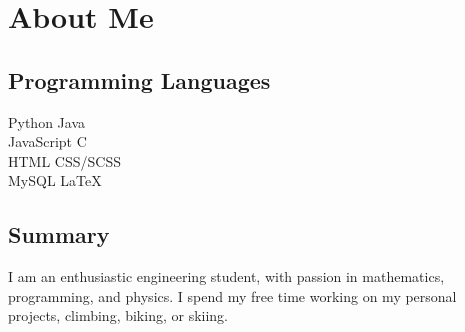 \documentclass[]{deedy-resume-openfont}
\begin{document}
\section{About Me}
\begin{minipage}[t]{.35\textwidth}
	\subsection{Programming Languages}
	Python \textbullet{} Java \\
	JavaScript \textbullet{} C \\
	HTML \textbullet{} CSS/SCSS \\
	MySQL \textbullet{} \LaTeX
	\sectionsep
\end{minipage}
\hfill
\begin{minipage}[t]{.55\textwidth}
	\subsection{Summary}
	I am an enthusiastic engineering student, with passion in mathematics, programming, and physics. I spend my free time working on my personal projects, climbing, biking, or skiing.

	\vspace{15pt}

\end{minipage}
\end{document}

